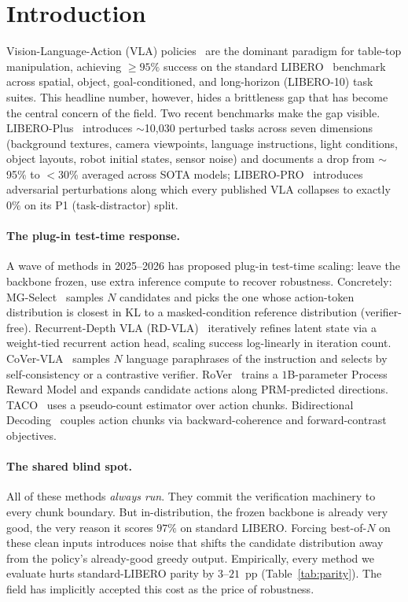 \documentclass{article}
\begin{document}
\section{Introduction}
\label{sec:intro}

Vision-Language-Action (VLA) policies~\citep{kim2024openvla,kim2025openvlaoft,
pi02024} are the dominant paradigm for table-top manipulation, achieving
$\geq 95\%$ success on the standard LIBERO~\citep{liu2023libero} benchmark
across spatial, object, goal-conditioned, and long-horizon (LIBERO-10) task
suites. This headline number, however, hides a brittleness gap that has
become the central concern of the field. Two recent benchmarks make the
gap visible. LIBERO-Plus~\citep{libero_plus2025} introduces
$\sim$10{,}030 perturbed tasks across seven dimensions
(background textures, camera viewpoints, language instructions, light
conditions, object layouts, robot initial states, sensor noise) and
documents a drop from $\sim$95\% to $<$30\% averaged across SOTA models;
LIBERO-PRO~\citep{libero_pro2025} introduces adversarial perturbations
along which every published VLA collapses to exactly $0\%$ on its P1
(task-distractor) split.

\paragraph{The plug-in test-time response.} A wave of methods in 2025--2026
has proposed plug-in test-time scaling: leave the backbone frozen, use
extra inference compute to recover robustness. Concretely:
MG-Select~\citep{mgselect2026} samples $N$ candidates and picks the one
whose action-token distribution is closest in KL to a masked-condition
reference distribution (verifier-free).
Recurrent-Depth VLA (RD-VLA)~\citep{rdvla2025} iteratively refines latent
state via a weight-tied recurrent action head, scaling success
log-linearly in iteration count.
CoVer-VLA~\citep{cover_vla2025} samples $N$ language paraphrases of the
instruction and selects by self-consistency or a contrastive verifier.
RoVer~\citep{rover2026} trains a $1$B-parameter Process Reward Model and
expands candidate actions along PRM-predicted directions.
TACO~\citep{taco2026} uses a pseudo-count estimator over action chunks.
Bidirectional Decoding~\citep{bid2024} couples action chunks via
backward-coherence and forward-contrast objectives.

\paragraph{The shared blind spot.}
All of these methods \emph{always run}. They commit the verification
machinery to every chunk boundary. But in-distribution, the frozen
backbone is already very good, the very reason it scores $97\%$ on
standard LIBERO. Forcing best-of-$N$ on these clean inputs introduces
noise that shifts the candidate distribution away from the policy's
already-good greedy output. Empirically, every method we evaluate hurts
standard-LIBERO parity by $3$--$21$~pp (Table~\ref{tab:parity}). The
field has implicitly accepted this cost as the price of robustness.
\end{document}
